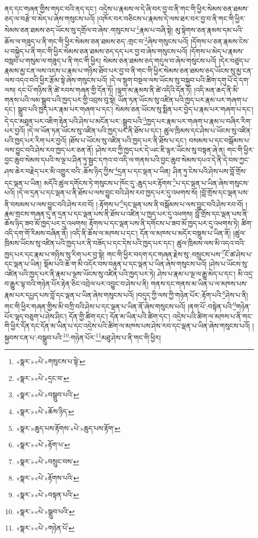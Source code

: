 ནད་དང་གཞན་གྱིས་གཏང་བའི་ནད་དང་། འདྲེས་པ་རྣམས་ལ་དེ་ཞི་བར་བྱ་བ་ནི་གང་གི་ཕྱིར་སེམས་ཅན་ཐམས་ཅད་ལ་བརྩེ་བ་མེད་པ་ཞེས་གསུངས་པའོ། །འཁོར་བར་བཅིངས་པ་རྣམས་དེ་ལས་ཐར་བར་བྱ་བ་ནི་གང་གི་ཕྱིར་སེམས་ཅན་ཐམས་ཅད་ཡོངས་སུ་དགྲོལ་བ་ཞེས་:གསུངས་པ་\footnote{«སྣར་»«པེ་»གསུངས་པ་སྟེ་}རྣམ་པ་བཞི་སྟེ། མུ་སྟེགས་ཅན་རྣམས་དམ་པའི་ཆོས་ལ་གཟུད་པ་ནི་གང་གི་ཕྱིར་སེམས་ཅན་ཐམས་ཅད་:གྲང་བ་\footnote{«སྣར་»«པེ་»དྲང་བ་}ཞེས་གསུངས་པའོ། །དོགས་པ་ཅན་རྣམས་ངེས་པ་བསྐྱེད་པ་ནི་གང་གི་ཕྱིར་སེམས་ཅན་ཐམས་ཅད་དད་པར་བྱ་བ་ཞེས་གསུངས་པའོ། །དོགས་པ་མེད་པ་རྣམས་བསླབ་པ་གསུམ་ལ་གཟུད་པ་ནི་གང་གི་ཕྱིར། སེམས་ཅན་ཐམས་ཅད་གདུལ་བ་ཞེས་གསུངས་པའོ། །དེར་བཙུད་པ་རྣམས་མྱ་ངན་ལས་འདས་པ་རྣམ་པ་གཉིས་ཐོབ་པར་བྱ་བ་ནི་གང་གི་ཕྱིར་སེམས་ཅན་ཐམས་ཅད་ཡོངས་སུ་མྱ་ངན་ལས་འདའ་བའི་ཕྱིར་རྩོམ་སྟེ་ཞེས་གསུངས་པའོ། །དེ་ལ་སྡུག་བསྔལ་ལས་ཡོངས་སུ་བསྐྱབ་པའི་ཚིག་དགུ་པོ་དེ་དག་ལས། དང་པོ་གཉིས་ནི་ཚེ་རབས་གཞན་གྱི་དོན་ཏོ། །ལྷག་མ་རྣམས་ནི་ཚེ་འདིའི་དོན་ཏོ། །འདི་མན་ཆད་ནི་མི་གནས་པའི་ལམ་སྒྲུབ་པའི་ཁྱད་པར་གྱི་འབྲས་བུ་སྟེ། ཡོན་ཏན་ཡོངས་སུ་འཛིན་པའི་ཁྱད་པར་རྣམ་པར་གཞག་པ་དང་། སྒྲུབ་པའི་ཁྱད་པར་རྣམ་པར་གཞག་པ་དང་། སེམས་ཅན་ཡོངས་སུ་སྨིན་པར་བྱེད་པ་རྣམ་པར་གཞག་པ་དང་། དེ་དང་མཐུན་པར་འཇིག་རྟེན་པའི་ཤེས་པ་མངོན་པར་:སྒྲུབ་པའི་\footnote{«སྣར་»«པེ་»བསྒྲུབ་པའི་}ཁྱད་པར་རྣམ་པར་གཞག་པ་རྣམ་པ་བཞིར་རིག་པར་བྱའོ། །དེ་ལ་ཡོན་ཏན་ཡོངས་སུ་འཛིན་པའི་ཁྱད་པར་ནི་ཐོས་པ་དང་། ཚུལ་ཁྲིམས་དང་ཤེས་པ་ཡོངས་སུ་འཛིན་པའི་ཁྱད་པར་རིག་པར་བྱའོ། །ཐོས་པ་ཡོངས་སུ་འཛིན་པའི་ཁྱད་པར་ནི་ཐོས་པ་དང་། བསམས་པ་དང་བསྒོམས་པ་ལས་བྱུང་བའི་ཤེས་རབ་ཁྱད་པར་ཅན་ནོ། །ཤེས་རབ་ཀྱི་ཁྱད་པར་དེ་ཡང་ཇི་ལྟར་ཡོངས་སུ་བསྟན་ཞེ་ན། གང་གི་ཕྱིར་བྱང་ཆུབ་སེམས་དཔའི་ས་ལྔ་པ་ཤིན་ཏུ་སྦྱང་དཀའ་བ་འདི་ལ་གནས་པའི་བྱང་ཆུབ་སེམས་དཔའ་དེ་ནི་དེ་བས་ཀྱང་ཤས་ཆེར་བརྗེད་པར་མི་འགྱུར་བའི་:ཆོས་ཉིད་ཀྱིས་\footnote{«སྣར་»«པེ་»ཆོས་ཉིད་}དྲན་པ་དང་ལྡན་པ་ཡིན། ཤིན་ཏུ་ངེས་པའི་ཤེས་པས་བློ་གྲོས་དང་ལྡན་པ་ཡིན། མདོའི་ཚུལ་དགོངས་ཏེ་གསུངས་པ་ཁོང་དུ་:ཆུད་པར་རྟོགས་\footnote{«སྣར་»ཆུད་པས་རྟོགས་«པེ་»ཆུད་པས་རྟོག་}པ་དང་ལྡན་པ་ཡིན་ཞེས་གསུངས་པའོ། །དེ་ལ་དྲན་པ་དང་ལྡན་པ་ནི་ཐོས་པ་ལས་བྱུང་བའི་ཤེས་རབ་ཁྱད་པར་དུ་འཕགས་སོ། །བློ་གྲོས་དང་ལྡན་པས་ནི་བསམས་པ་ལས་བྱུང་བའི་ཤེས་རབ་བོ། །:རྟོགས་པ་\footnote{«སྣར་»«པེ་»རྟོག་པ་}དང་ལྡན་པས་ནི་བསྒོམས་པ་ལས་བྱུང་བའི་ཤེས་རབ་བོ། །རྣམ་གྲངས་གཞན་དུ་ན་དྲན་པ་དང་ལྡན་པས་ནི་ཐོས་པ་འཛིན་པ་ཁྱད་པར་དུ་འཕགས། བློ་གྲོས་དང་ལྡན་པས་ནི་ཆོས་ཉིད་ཟབ་མོ་ཁྱད་པར་དུ་འཕགས། རྟོགས་པ་དང་ལྡན་པས་ནི་དགོངས་པ་ཟབ་མོ་ཁྱད་པར་དུ་འཕགས་ཏེ། ཚིག་འདི་དག་གོ་རིམས་བཞིན་ནོ། །འདི་ནི་ཆོས་ལ་མཁས་པ་དང་། དོན་ལ་མཁས་པ་མདོར་བསྡུས་པ་ཡིན་ནོ། །ཚུལ་ཁྲིམས་ཡོངས་སུ་འཛིན་པའི་ཁྱད་པར་ནི་བཟོད་པ་དང་དེས་པའི་ཁྱད་པར་དང་། ཚུལ་ཁྲིམས་ལས་མི་འདའ་བའི་ཁྱད་པར་དང་རྣམ་པ་གཉིས་སུ་རིག་པར་བྱ་སྟེ། གང་གི་ཕྱིར་བདག་དང་གཞན་རྗེས་སུ་:བསྲུངས་པས་\footnote{«སྣར་»«པེ་»བསྲུང་བས་}ངོ་ཚ་ཤེས་པ་དང་ལྡན་པ་ཡིན། སྡོམ་པའི་ཆོ་ག་མི་འདོར་བས་བརྟུན་པ་དང་ལྡན་པ་ཡིན་ཞེས་གསུངས་པའོ། །ཤེས་པ་ཡོངས་སུ་འཛིན་པའི་ཁྱད་པར་ནི་རྣམ་པ་ལྔས་ཡོངས་སུ་འཛིན་པའི་ཁྱད་པར་ཏེ། ཤེས་པ་རྣམ་པ་ལྔ་ལ་རྒྱུ་མེད་པ་དང་། མི་འདྲ་བ་རྒྱུར་ལྟ་བའི་གཉེན་པོར་རྟེན་ཅིང་འབྲེལ་པར་འབྱུང་བ་ཤེས་པ་ནི། གནས་དང་གནས་མ་ཡིན་པ་ལ་མཁས་པས་རྣམ་པར་དཔྱད་པས་བློ་དང་ལྡན་པ་ཡིན་ཞེས་གསུངས་པའོ། །བདུད་ཀྱི་ལས་ཀྱི་གཉེན་པོར་:རྟོག་པའི་\footnote{«སྣར་»«པེ་»རྟོགས་པའི་}ཤེས་པ་ནི། གང་གི་ཕྱིར་གཞན་གྱིས་མི་བཀྲི་བའི་ཤེས་པ་དང་ལྡན་པ་ཡིན་ནོ་ཞེས་གསུངས་པའོ། །ནག་པོ་:བསྟེན་པའི་\footnote{«སྣར་»«པེ་»བསྟན་པའི་}གཉེན་པོར་ལྷད་བཅུག་པ་ཤེས་ཤིང་། དོན་གྱི་ཚིག་དང་། དོན་མ་ཡིན་པའི་ཚིག་དང་། འདྲེས་པའི་ཚིག་ལ་མཁས་པ་ནི་གང་གི་ཕྱིར་དོན་དང་དོན་མ་ཡིན་པ་དང་འདྲེས་པའི་ཚིག་ལ་མཁས་པས་ཤེས་རབ་དང་ལྡན་པ་ཡིན་ཞེས་གསུངས་པའོ། །སྐྱབས་ངན་པ་:བསྒྲུབ་པའི་\footnote{«སྣར་»«པེ་»སྒྲུབ་པའི་}:གཉེན་པོར་\footnote{«སྣར་»«པེ་»གཉེན་པོ་}མཐུ་ཤེས་པ་ནི་གང་གི་ཕྱིར། 